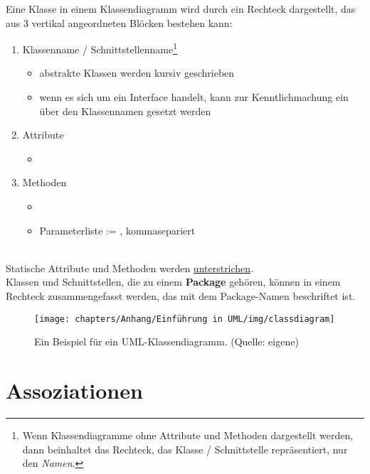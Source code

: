 \noindent
Eine Klasse in einem Klassendiagramm wird durch ein Rechteck dargestellt, das aus 3 vertikal angeordneten Blöcken bestehen kann:\\

\begin{enumerate}
    \item Klassenname / Schnittstellenname\footnote{
        Wenn Klassendiagramme ohne Attribute und Methoden dargestellt werden, dann beinhaltet das Rechteck, das Klasse / Schnittstelle repräsentiert, nur den \textit{Namen}.
    }
        \begin{itemize}
            \item abstrakte Klassen werden kursiv geschrieben
            \item wenn es sich um ein Interface handelt, kann zur Kenntlichmachung ein  über den Klassennamen gesetzt werden
        \end{itemize}
    \item Attribute
        \begin{itemize}
            \item[] \code{[Sichtbarkeit] [Name]:[Typ]}
        \end{itemize}
    \item Methoden
    \begin{itemize}
        \item[] \code{[Sichtbarkeit] [Name]([Parameterliste]):[Rückgabetyp]}
        \item[] Parameterliste := , kommasepariert
    \end{itemize}
\end{enumerate}\\

\noindent
Statische Attribute und Methoden werden \ul{unterstrichen}.\\

\noindent
Klassen und Schnittstellen, die zu einem \textbf{Package} gehören, können in einem Rechteck zusammengefasst werden, das mit dem Package-Namen beschriftet ist.

\begin{figure}
    \centering
    \texttt{[image: chapters/Anhang/Einführung in UML/img/classdiagram]}
    \caption{Ein Beispiel für ein UML-Klassendiagramm. (Quelle: eigene)}
    \label{fig:classdiagram}
\end{figure}

\section{Assoziationen}

